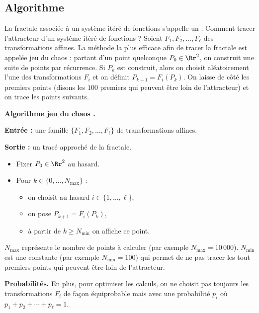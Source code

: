 \documentclass[11pt,class=report,crop=false]{standalone}
\begin{document}
\subsection{Algorithme}

La fractale associée à un système itéré de fonctions s'appelle un .
Comment tracer l'attracteur d'un système itéré de fonctions ?
Soient $F_1,F_2,\ldots,F_\ell$ des transformations affines. 
La méthode la plus efficace afin de tracer la fractale est appelée \og{}jeu du chaos\fg{} :
partant d'un point quelconque $P_0 \in \Rr^2$, on construit une suite de points par récurrence.
Si $P_k$ est construit, alors on choisit aléatoirement l'une des transformations
$F_i$ et on définit $P_{k+1}=F_i(P_k)$. 
On laisse de côté les premiers points (disons les $100$ premiers qui peuvent être \og loin \fg{} de l'attracteur) et on trace les points suivants.

\begin{algorithme}
\textbf{Algorithme \og jeu du chaos \fg{}.}

\textbf{Entrée :} une famille $\{ F_1, F_2,\ldots,F_\ell \}$ de transformations affines.

\textbf{Sortie :} un tracé approché de la fractale.

\begin{itemize}
  \item Fixer $P_0 \in \Rr^2$ au hasard.
    
  \item Pour $k \in \{0,\ldots,N_{\max}\}$ :
  \begin{itemize}
      \item on choisit au hasard $i \in \{1,\ldots,\ell\}$,
      \item on pose $P_{k+1} = F_i(P_k)$,
      \item à partir de $k \ge N_{\min}$ on affiche ce point.
  \end{itemize}
\end{itemize}
\end{algorithme}

$N_{\max}$ représente le nombre de points à calculer (par exemple $N_{\max} = 10\,000$).
$N_{\min}$ est une constante (par exemple $N_{\min} = 100$) qui permet de ne pas tracer les tout premiers points qui peuvent être loin de l'attracteur.


\textbf{Probabilités.}
En plus, pour optimiser les calculs, on ne choisit pas toujours les transformations $F_i$ de façon équiprobable mais avec une probabilité $p_i$ où $p_1+p_2+\cdots+p_\ell=1$. 
\end{document}
